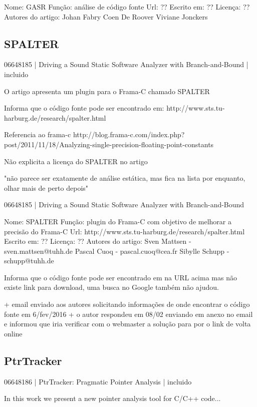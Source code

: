 Nome: GASR
Função: análise de código fonte
Url: ??
Escrito em: ??
Licença: ??
Autores do artigo: Johan Fabry
                   Coen De Roover
                   Viviane Jonckers



\subsection{SPALTER}

06648185 | Driving a Sound Static Software Analyzer with Branch-and-Bound | incluido

O artigo apresenta um plugin para o Frama-C chamado SPALTER

Informa que o código fonte pode ser encontrado em:
http://www.sts.tu-harburg.de/research/spalter.html

Referencia ao frama-c
http://blog.frama-c.com/index.php?post/2011/11/18/Analyzing-single-precision-floating-point-constants

Não explicita a licença do SPALTER no artigo

"não parece ser exatamente de análise estática, mas fica na lista por
enquanto, olhar mais de perto depois"

06648185 | Driving a Sound Static Software Analyzer with Branch-and-Bound

Nome: SPALTER
Função: plugin do Frama-C com objetivo de melhorar a precisão do Frama-C
Url: http://www.sts.tu-harburg.de/research/spalter.html
Escrito em: ??
Licença: ??
Autores do artigo: Sven Mattsen - sven.mattsen@tuhh.de
                   Pascal Cuoq - pascal.cuoq@cea.fr
                   Sibylle Schupp - schupp@tuhh.de

Informa que o código fonte pode ser encontrado em na URL acima mas não existe
link para download, uma busca no Google também não ajudou.

+ email enviado aos autores solicitando informações de onde encontrar o código fonte
  em 6/fev/2016
  + o autor respondeu em 08/02 enviando em anexo no email e informou que iria verificar
    com o webmaster a solução para por o link de volta online


\subsection{PtrTracker}

06648186 | PtrTracker: Pragmatic Pointer Analysis | incluido

In this work we present a new pointer analysis tool for C/C++ code...

